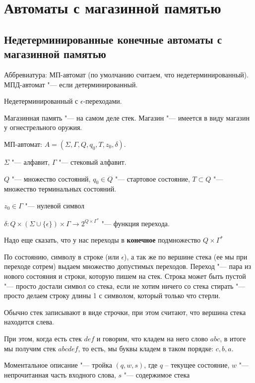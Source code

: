 \section{Автоматы с магазинной памятью}
\subsection{Недетерминированные конечные автоматы с магазинной памятью}
\begin{Rem}
Аббревиатура: МП-автомат (по умолчанию считаем, что недетерминированный). МПД-автомат "--- если детерминированный.
\end{Rem}
\begin{Rem}
Недетерминированный с $\epsilon$-переходами.
\end{Rem}
Магазинная память "--- на самом деле стек. Магазин "--- имеется в виду магазин у огнестрельного оружия.

\begin{Def}
МП-автомат: $A = (\Sigma, \Gamma, Q, q_0, T, z_0, \delta)$.

$\Sigma$ "--- алфавит, $\Gamma$ "--- стековый алфавит.

$Q$ "--- множество состояний, $q_0 \in Q$ "--- стартовое состояние, $T \subset Q$ "--- множество терминальных состояний.

$z_0 \in \Gamma$ "--- нулевой символ

$\delta \colon Q \times (\Sigma \cup \{\epsilon\}) \times \Gamma \to 2^{Q \times \Gamma^*}$ "--- функция перехода. 
\begin{Rem}
Надо еще сказать, что у нас переходы в \textbf{конечное} подмножество $Q \times \Gamma^*$
\end{Rem}

По состоянию, символу в строке (или $\epsilon$), а так же по вершине стека (ее мы при переходе сотрем) выдаем множество допустимых переходов.
Переход "--- пара из нового состояния и строки, которую пишем на стек. 
Строка может быть пустой "--- просто достали символ со стека, если не хотим ничего со стека стирать "--- просто делаем строку длины 1 с символом, который только что стерли.
\end{Def}
\begin{Rem}
Обычно стек записывают в виде строчки, при этом считают, что вершина стека находится слева.
\end{Rem}
\begin{Rem}
При этом, когда есть стек $def$ и говорим, что кладем на него слово $abc$, в итоге мы получим стек $abcdef$, то есть, мы буквы кладем в таком порядке: $c, b, a$.
\end{Rem}
\begin{Def}
Моментальное описание "--- тройка $(q, w, s)$, где $q$ -- текущее состояние, $w$ "--- непрочитанная часть входного слова, $s$ "--- содержимое стека
\end{Def}

